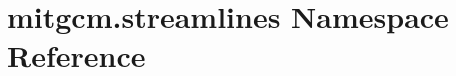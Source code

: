 \hypertarget{namespacemitgcm_1_1streamlines}{\section{mitgcm.\+streamlines Namespace Reference}
\label{namespacemitgcm_1_1streamlines}
}

